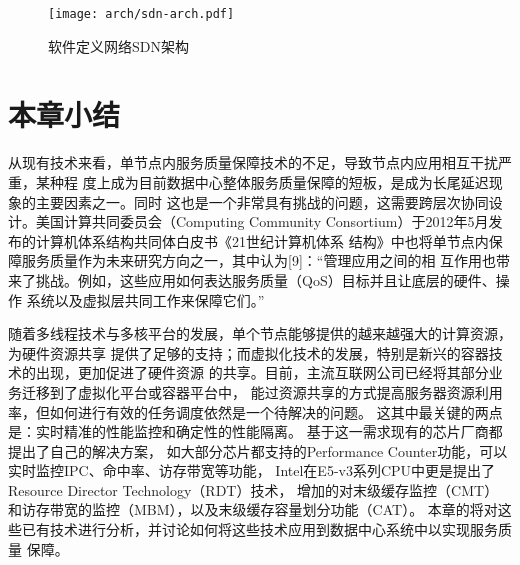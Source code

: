 \begin{figure}[tbh]
  \centering
  \texttt{[image: arch/sdn-arch.pdf]}
  \caption{软件定义网络SDN架构}
  \label{fig:pard-arch-outline}
\end{figure}


\section{本章小结}

从现有技术来看，单节点内服务质量保障技术的不足，导致节点内应用相互干扰严重，某种程
度上成为目前数据中心整体服务质量保障的短板，是成为长尾延迟现象的主要因素之一。同时
这也是一个非常具有挑战的问题，这需要跨层次协同设计。美国计算共同委员会（Computing 
Community Consortium）于2012年5月发布的计算机体系结构共同体白皮书《21世纪计算机体系
结构》中也将单节点内保障服务质量作为未来研究方向之一，其中认为[9]：“管理应用之间的相
互作用也带来了挑战。例如，这些应用如何表达服务质量（QoS）目标并且让底层的硬件、操作
系统以及虚拟层共同工作来保障它们。”

\iffalse



随着多线程技术与多核平台的发展，单个节点能够提供的越来越强大的计算资源，为硬件资源共享
提供了足够的支持；而虚拟化技术的发展，特别是新兴的容器技术的出现，更加促进了硬件资源
的共享。目前，主流互联网公司已经将其部分业务迁移到了虚拟化平台或容器平台中，
能过资源共享的方式提高服务器资源利用率，但如何进行有效的任务调度依然是一个待解决的问题。
这其中最关键的两点是：实时精准的性能监控和确定性的性能隔离。
基于这一需求现有的芯片厂商都提出了自己的解决方案， %
如大部分芯片都支持的Performance Counter功能，可以实时监控IPC、命中率、访存带宽等功能，
Intel在E5-v3系列CPU中更是提出了Resource Director Technology（RDT）技术，
增加的对末级缓存监控（CMT）和访存带宽的监控（MBM），以及末级缓存容量划分功能（CAT）。
本章的将对这些已有技术进行分析，并讨论如何将这些技术应用到数据中心系统中以实现服务质量
保障。

